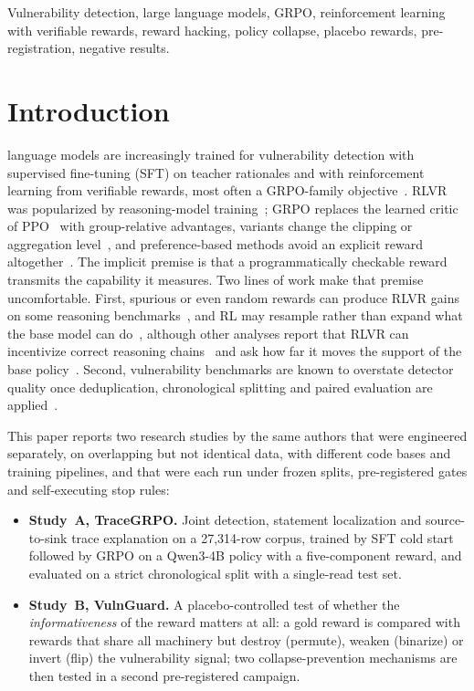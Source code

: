\documentclass[journal]{IEEEtran}
\begin{document}
\begin{IEEEkeywords}
Vulnerability detection, large language models, GRPO, reinforcement learning with verifiable rewards, reward hacking, policy collapse, placebo rewards, pre-registration, negative results.
\end{IEEEkeywords}

\section{Introduction}
 language models are increasingly trained for vulnerability detection with supervised fine-tuning (SFT) on teacher rationales and with reinforcement learning from verifiable rewards, most often a GRPO-family objective~\cite{grpo,vulpo,openvul,r2vul,vulnllmr,simoni}. RLVR was popularized by reasoning-model training~\cite{r1,tulu3}; GRPO replaces the learned critic of PPO~\cite{ppo} with group-relative advantages, variants change the clipping or aggregation level~\cite{gspo,dapo,drgrpo}, and preference-based methods avoid an explicit reward altogether~\cite{dpo}. The implicit premise is that a programmatically checkable reward transmits the capability it measures. Two lines of work make that premise uncomfortable. First, spurious or even random rewards can produce RLVR gains on some reasoning benchmarks~\cite{spurious}, and RL may resample rather than expand what the base model can do~\cite{yue,prorl}, although other analyses report that RLVR can incentivize correct reasoning chains~\cite{wen} and ask how far it moves the support of the base policy~\cite{leash}. Second, vulnerability benchmarks are known to overstate detector quality once deduplication, chronological splitting and paired evaluation are applied~\cite{primevul,risse,das}.

This paper reports two research studies by the same authors that were engineered separately, on overlapping but not identical data, with different code bases and training pipelines, and that were each run under frozen splits, pre-registered gates and self-executing stop rules:

\begin{itemize}
\item \textbf{Study~A, TraceGRPO.} Joint detection, statement localization and source-to-sink trace explanation on a 27,314-row corpus, trained by SFT cold start followed by GRPO on a Qwen3-4B policy with a five-component reward, and evaluated on a strict chronological split with a single-read test set.
\item \textbf{Study~B, VulnGuard.} A placebo-controlled test of whether the \emph{informativeness} of the reward matters at all: a gold reward is compared with rewards that share all machinery but destroy (permute), weaken (binarize) or invert (flip) the vulnerability signal; two collapse-prevention mechanisms are then tested in a second pre-registered campaign.
\end{itemize}
\end{document}
